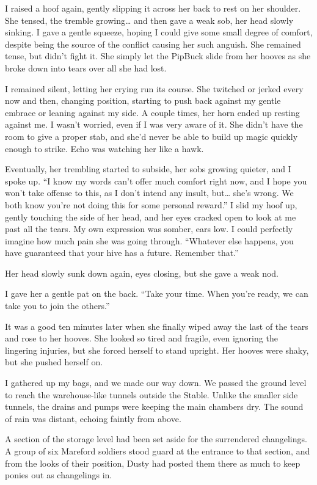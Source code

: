 I raised a hoof again, gently slipping it across her back to rest on her shoulder. She tensed, the tremble growing… and then gave a weak sob, her head slowly sinking. I gave a gentle squeeze, hoping I could give some small degree of comfort, despite being the source of the conflict causing her such anguish. She remained tense, but didn’t fight it. She simply let the PipBuck slide from her hooves as she broke down into tears over all she had lost.

I remained silent, letting her crying run its course. She twitched or jerked every now and then, changing position, starting to push back against my gentle embrace or leaning against my side. A couple times, her horn ended up resting against me. I wasn’t worried, even if I was very aware of it. She didn’t have the room to give a proper stab, and she’d never be able to build up magic quickly enough to strike. Echo was watching her like a hawk.

Eventually, her trembling started to subside, her sobs growing quieter, and I spoke up. “I know my words can’t offer much comfort right now, and I hope you won’t take offense to this, as I don’t intend any insult, but… she’s wrong. We both know you’re not doing this for some personal reward.” I slid my hoof up, gently touching the side of her head, and her eyes cracked open to look at me past all the tears. My own expression was somber, ears low. I could perfectly imagine how much pain she was going through. “Whatever else happens, you have guaranteed that your hive has a future. Remember that.”

Her head slowly sunk down again, eyes closing, but she gave a weak nod.

I gave her a gentle pat on the back. “Take your time. When you’re ready, we can take you to join the others.”

It was a good ten minutes later when she finally wiped away the last of the tears and rose to her hooves. She looked so tired and fragile, even ignoring the lingering injuries, but she forced herself to stand upright. Her hooves were shaky, but she pushed herself on.

I gathered up my bags, and we made our way down. We passed the ground level to reach the warehouse-like tunnels outside the Stable. Unlike the smaller side tunnels, the drains and pumps were keeping the main chambers dry. The sound of rain was distant, echoing faintly from above.

A section of the storage level had been set aside for the surrendered changelings. A group of six Mareford soldiers stood guard at the entrance to that section, and from the looks of their position, Dusty had posted them there as much to keep ponies out as changelings in.

